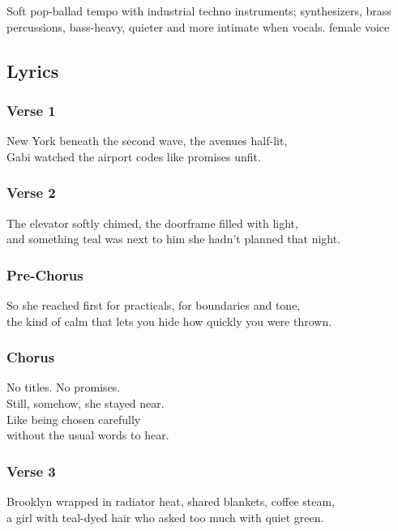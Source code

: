 Soft pop-ballad tempo with industrial techno instruments; synthesizers,
brass percussions, bass-heavy, quieter and more intimate when vocals.
female voice

\subsection{Lyrics}\label{lyrics-12}

\subsubsection{Verse 1}\label{verse-1-8}

New York beneath the second wave, the avenues half-lit,\\
Gabi watched the airport codes like promises unfit.

\subsubsection{Verse 2}\label{verse-2-8}

The elevator softly chimed, the doorframe filled with light,\\
and something teal was next to him she hadn't planned that night.

\subsubsection{Pre-Chorus}\label{pre-chorus-17}

So she reached first for practicals, for boundaries and tone,\\
the kind of calm that lets you hide how quickly you were thrown.

\subsubsection{Chorus}\label{chorus-27}

No titles. No promises.\\
Still, somehow, she stayed near.\\
Like being chosen carefully\\
without the usual words to hear.

\subsubsection{Verse 3}\label{verse-3-5}

Brooklyn wrapped in radiator heat, shared blankets, coffee steam,\\
a girl with teal-dyed hair who asked too much with quiet green.

